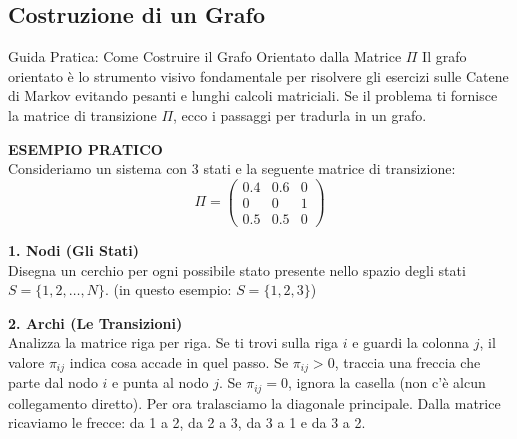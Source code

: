 \documentclass[12pt]{extarticle} %
\begin{document}
\subsection{Costruzione di un Grafo}
\begin{eserciziobox}{Guida Pratica: Come Costruire il Grafo Orientato dalla Matrice $\Pi$}
Il grafo orientato è lo strumento visivo fondamentale per risolvere gli esercizi sulle Catene di Markov evitando pesanti e lunghi calcoli matriciali. Se il problema ti fornisce la matrice di transizione $\Pi$, ecco i passaggi per tradurla in un grafo.

\vspace{0.3cm}
\textbf{ESEMPIO PRATICO} \\
Consideriamo un sistema con 3 stati e la seguente matrice di transizione:
$$ \Pi = \begin{pmatrix} 0.4 & 0.6 & 0 \\ 0 & 0 & 1 \\ 0.5 & 0.5 & 0 \end{pmatrix} $$

\hrulefill

\textbf{1. Nodi (Gli Stati)} \\
Disegna un cerchio per ogni possibile stato presente nello spazio degli stati $S = \{1, 2, \dots, N\}$. (in questo esempio: $S = \{1, 2, 3\}$)
\begin{center}
\end{center}

\textbf{2. Archi (Le Transizioni)} \\
Analizza la matrice riga per riga. Se ti trovi sulla riga $i$ e guardi la colonna $j$, il valore $\pi_{ij}$ indica cosa accade in quel passo. Se $\pi_{ij} > 0$, traccia una freccia che parte dal nodo $i$ e punta al nodo $j$. Se $\pi_{ij} = 0$, ignora la casella (non c'è alcun collegamento diretto). Per ora tralasciamo la diagonale principale. Dalla matrice ricaviamo le frecce: da 1 a 2, da 2 a 3, da 3 a 1 e da 3 a 2.
\begin{center}
\end{center}
\end{eserciziobox}
\end{document}
